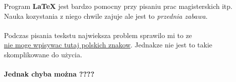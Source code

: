 Program \textbf{LaTeX} jest bardzo pomocny przy pisaniu prac magisterskich itp. 
Nauka kozystania z niego chwile zajuje ale jest to \emph{przednia zabawa}.\\\\

Podczas pisania teskstu najwieksza problem sprawilo mi to ze\\ \underline{nie moge wpisywac
tutaj polskich znakow}. Jednakze nie jest to takie skomplikowane do użycia.\\\\
\textbf{Jednak chyba można ????}
    
\newpage